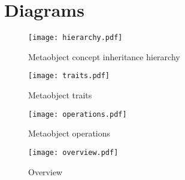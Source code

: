 \section{Diagrams}

\begin{figure}[H]
\centering
\texttt{[image: hierarchy.pdf]}
\caption{Metaobject concept inheritance hierarchy}
\end{figure}

\begin{figure}[H]
\centering
\texttt{[image: traits.pdf]}
\caption{Metaobject traits}
\end{figure}

\begin{figure}[H]
\centering
\texttt{[image: operations.pdf]}
\caption{Metaobject operations}
\end{figure}

\begin{sidewaysfigure}
\centering
\texttt{[image: overview.pdf]}
\caption{Overview}
\end{sidewaysfigure}

